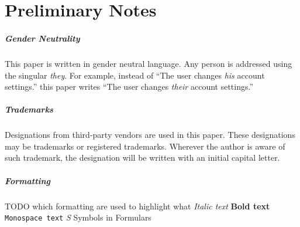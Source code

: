 \clearpage
\chapter*{Preliminary Notes}
\label{chap:prenotes}
\thispagestyle{scrheadings}

\paragraph{Gender Neutrality}
This paper is written in gender neutral language.
Any person is addressed using the singular \emph{they}.
For example, instead of
``The user changes \emph{his} account settings.''
this paper writes
``The user changes \emph{their} account settings.''


\paragraph{Trademarks}
Designations from third-party vendors are used in this paper.
These designations may be trademarks or registered trademarks.
Wherever the author is aware of such trademark,
the designation will be written with an initial capital letter.

\paragraph{Formatting}
TODO which formatting are used to highlight what
\emph{Italic text}
\textbf{Bold text}
\texttt{Monospace text}
\textit{S} Symbols in Formulars
